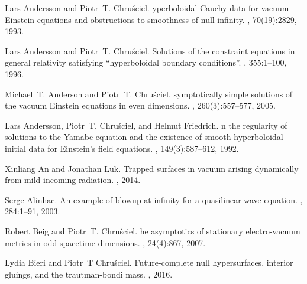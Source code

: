 \documentclass[reqno,11pt,letterpaper]{amsart}
\numberwithin{equation}{section}
\numberwithin{figure}{section}
\theoremstyle{definition}
\theoremstyle{remark}
\begin{document}

%

\begin{thebibliography}{GCHMG05}

Lars Andersson and Piotr~T. Chru{\'s}ciel.
yperboloidal {C}auchy data for vacuum {E}instein equations and
  obstructions to smoothness of null infinity.
, 70(19):2829, 1993.

Lars Andersson and Piotr~T. Chru{\'s}ciel.
\newblock Solutions of the constraint equations in general relativity
  satisfying ``hyperboloidal boundary conditions''.
,
  355:1--100, 1996.

Michael~T. Anderson and Piotr~T. Chru{\'s}ciel.
symptotically simple solutions of the vacuum {E}instein equations
  in even dimensions.
, 260(3):557--577, 2005.

Lars Andersson, Piotr~T. Chru{\'s}ciel, and Helmut Friedrich.
n the regularity of solutions to the {Y}amabe equation and the
  existence of smooth hyperboloidal initial data for {E}instein's field
  equations.
, 149(3):587--612, 1992.

Xinliang An and Jonathan Luk.
\newblock Trapped surfaces in vacuum arising dynamically from mild incoming
  radiation.
, 2014.

Serge Alinhac.
\newblock An example of blowup at infinity for a quasilinear wave equation.
, 284:1--91, 2003.

Robert Beig and Piotr~T. Chru{\'s}ciel.
he asymptotics of stationary electro-vacuum metrics in odd
  spacetime dimensions.
, 24(4):867, 2007.

Lydia Bieri and Piotr~T Chru{\'s}ciel.
\newblock Future-complete null hypersurfaces, interior gluings, and the
  trautman-bondi mass.
, 2016.


\end{thebibliography}
\end{document}
